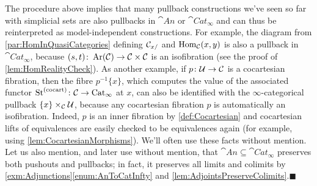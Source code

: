 \begin{numpar}
	The procedure above implies that many pullback constructions we've seen so far with simplicial sets are also pullbacks in $\cat{An}$ or $\cat{Cat}_\infty$ and can thus be reinterpreted as model-independent constructions. For example, the diagram from \cref{par:HomInQuasiCategories} defining $\mathcal{C}_{x/}$ and $\operatorname{Hom}_{\mathcal{C}}(x,y)$ is also a pullback in $\cat{Cat}_\infty$, because $(s,t)\colon \operatorname{Ar}(\mathcal{C})\rightarrow \mathcal{C}\times\mathcal{C}$ is an isofibration (see the proof of \cref{lem:HomRealityCheck}). As another example, if $p\colon\mathcal{U}\rightarrow \mathcal{C}$ is a cocartesian fibration, then the fibre $p^{-1}\{x\}$, which computes the value of the associated functor $\operatorname{St}^{(\mathrm{cocart})}\colon \mathcal{C}\rightarrow\mathrm{Cat}_\infty$ at $x$, can also be identified with the $\infty$-categorical pullback $\{x\}\times_{\mathcal{C}}\mathcal{U}$, because any cocartesian fibration $p$ is automatically an isofibration. Indeed, $p$ is an inner fibration by \cref{def:Cocartesian} and cocartesian lifts of equivalences are easily checked to be equivalences again (for example, using \cref{lem:CocartesianMorphisms}). We'll often use these facts without mention. Let us also mention, and later use without mention, that $\cat{An}\subseteq\cat{Cat}_\infty$ preserves both pushouts and pullbacks; in fact, it preserves all limits and colimits by \cref{exm:Adjunctions}\cref{enum:AnToCatInfty} and \cref{lem:AdjointsPreserveColimits}.\hfill$\blacksquare$
\end{numpar}
